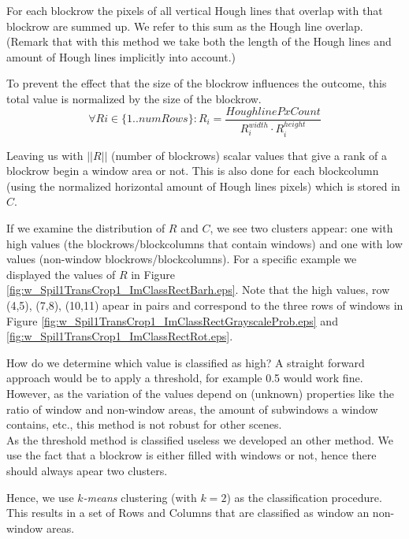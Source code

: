 For each blockrow the pixels of all vertical Hough lines that overlap with that
blockrow are summed up. We refer to this sum as the Hough line overlap.
(Remark that with this method we take both the length of the Hough lines and
amount of Hough lines implicitly into account.)

To prevent the effect that the size of the blockrow influences the outcome, this total value
is normalized by the size of the blockrow.
\[\forall Ri\in \{1..numRows\} : R_i = \frac{HoughlinePxCount}{R_i^{width} \cdot R_i^{height}}\]

Leaving us with $||R||$ (number of blockrows) scalar values that give a rank of a blockrow begin a window area or not.
This is also done for each blockcolumn (using the normalized horizontal amount of
Hough lines pixels) which is stored in $C$.

If we examine the distribution of $R$ and $C$, we see two clusters appear: one with
high values (the blockrows/blockcolumns that contain windows) and one with low
values (non-window blockrows/blockcolumns). For a specific example we displayed the values of $R$ in Figure \ref{fig:w_Spil1TransCrop1_ImClassRectBarh.eps}.
Note that the high values, row (4,5), (7,8), (10,11) apear in pairs and
correspond to the three rows of windows in Figure
\ref{fig:w_Spil1TransCrop1_ImClassRectGrayscaleProb.eps} and
\ref{fig:w_Spil1TransCrop1_ImClassRectRot.eps}.

How do we determine which value is classified as high?  A straight forward
approach would be to apply a threshold, for example 0.5 would work fine.
However, as the variation of the values depend on (unknown) properties like the
ratio of window and non-window areas, the amount of subwindows a window
contains, etc., this method is not robust for other scenes.\\

As the threshold method is classified useless we developed an other method.
We use the fact that a blockrow is either filled with windows or not, hence
there should always apear two clusters.  

Hence, we use \emph{$k$-means} clustering (with
$k=2$) as the classification procedure.
This results in a set of Rows and Columns that are classified as window an
non-window areas.\\


